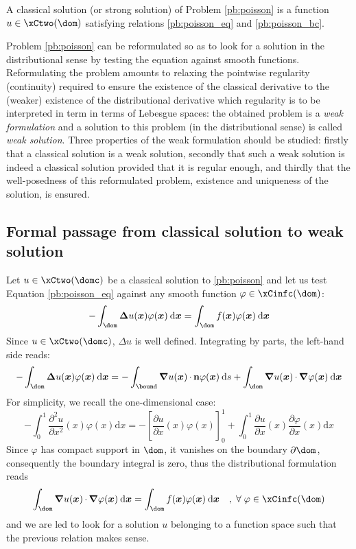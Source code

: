 \begin{dfntn} A classical solution (or strong solution) of Problem \eqref{pb:poisson} is a function $u \in \xCtwo(\dom)$ satisfying relations \eqref{pb:poisson_eq} and \eqref{pb:poisson_bc}.
\end{dfntn}

Problem \eqref{pb:poisson} can be reformulated so as to look for a solution in the distributional sense by testing the equation against smooth functions.
Reformulating the problem amounts to relaxing the pointwise regularity (\ie continuity) required to ensure the existence of the classical derivative to the (weaker) existence of the distributional derivative which regularity is to be interpreted in term in terms of Lebesgue spaces: the obtained problem is a \textit{weak formulation} and a solution to this problem (\ie in the distributional sense) is called \textit{weak solution}.
Three properties of the weak formulation should be studied: firstly that a classical solution is a weak solution, secondly that such a weak solution is indeed a classical solution provided that it is regular enough, and thirdly that the well-posedness of this reformulated problem, \ie existence and uniqueness of the solution, is ensured.


\subsection{Formal passage from classical solution to weak solution}

Let $u \in \xCtwo(\domc)$ be a classical solution to \eqref{pb:poisson} and let us test Equation \eqref{pb:poisson_eq} against any smooth function $\varphi\in\xCinfc(\dom)$:
\begin{equation*}
- \int_\dom \Lap u(\xx) \varphi(\xx) \dx = \int_\dom f(\xx) \varphi(\xx)  \dx
\end{equation*}
Since $u \in \xCtwo(\domc)$, $\Delta u$ is well defined. Integrating by parts, the left-hand side reads:
\begin{equation*}
- \int_\dom \Lap u(\xx) \varphi(\xx) \dx = - \int_\bound \Grad u(\xx) \xDot \n \varphi(\xx) \ds + \int_\dom \Grad u(\xx)\xDot \Grad \varphi(\xx) \dx
\end{equation*}
For simplicity, we recall the one-dimensional case:
\begin{equation*}
- \int_0^1 \frac{\partial^2 u}{\partial x^2}(x)  \varphi(x) {\mathrm d}x = - \left[ \frac{\partial u}{\partial x}(x) \varphi(x) \right]_0^1 + \int_0^1 \frac{\partial u}{\partial x}(x) \frac{\partial \varphi}{\partial x}(x) {\mathrm d}x
\end{equation*}
Since $\varphi$ has compact support in $\dom$, it vanishes on the boundary $\partial\dom$, consequently the boundary integral is zero, thus the distributional formulation reads
\begin{equation*}
\int_\dom \Grad u(\xx)\xDot \Grad \varphi(\xx) \dx = \int_\dom f(\xx) \varphi(\xx)  \dx\quad,\;\forany\varphi\in\xCinfc(\dom)
\end{equation*}
and we are led to look for a solution $u$ belonging to a function space such that the previous relation makes sense.

